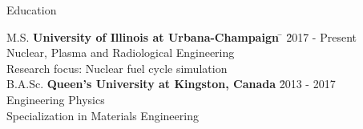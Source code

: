 \documentclass{resume2} %
\begin{document}
\centering
\iffalse
I am an engineer that is passionate about \\ 
nuclear technology and developing innovative \\
systems to face today's energy challenges.   

Gwen is passionate about nuclear power and developing \\
innovative systems to improve nuclear energy and fuel cycle\\
technologies. She wants to contribute to pressing global\\
energy challenges and environmental sustainability. 
\fi

\raggedright

\begin{rSection}{Education}
	
\begin{tabbing}
M.S. \hspace*{2 em}\= \textbf{University of Illinois at Urbana-Champaign} \hspace*{5em} \= \hspace*{6em} \= 2017 - Present \\
\> Nuclear, Plasma and Radiological Engineering \\
\> Research focus: Nuclear fuel cycle simulation \\
%
B.A.Sc. \hspace*{2 em}\> \textbf{Queen's University at Kingston, Canada} \> \hspace*{7.2em} \= 2013 - 2017 \\
\> Engineering Physics \\
\> Specialization in Materials Engineering 
\end{tabbing}

\end{rSection}

\end{document}
